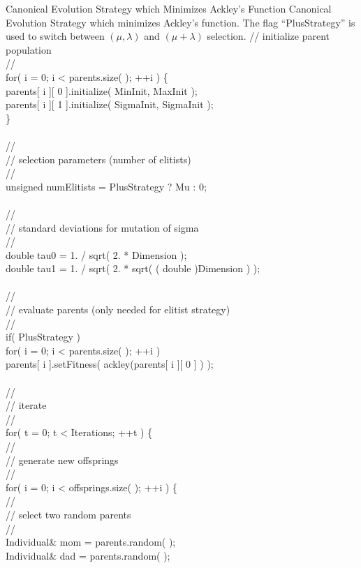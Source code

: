 \begin{programlisting}{Canonical Evolution Strategy which Minimizes Ackley's Function}{
    Canonical Evolution Strategy which minimizes Ackley's function.
    The flag ``PlusStrategy'' is used to switch between $(\mu,\lambda)$
    and $(\mu+\lambda)$ selection.}
    // initialize parent population\\
    //\\
    for( i = 0; i < parents.size( ); ++i ) \{\\
       parents[ i ][ 0 ].initialize( MinInit,   MaxInit   );\\
       parents[ i ][ 1 ].initialize( SigmaInit, SigmaInit );\\
    \}\\
\\
    //\\
    // selection parameters (number of elitists)\\
    //\\
    unsigned numElitists = PlusStrategy ? Mu : 0;\\
\\
    //\\
    // standard deviations for mutation of sigma\\
    //\\
    double     tau0 = 1. / sqrt( 2. * Dimension );\\
    double     tau1 = 1. / sqrt( 2. * sqrt( ( double )Dimension ) );\\
\\
    //\\
    // evaluate parents (only needed for elitist strategy)\\
    //\\
    if( PlusStrategy )\\
        for( i = 0; i < parents.size( ); ++i )\\
            parents[ i ].setFitness( ackley(parents[ i ][ 0 ] ) );\\
\\
    //\\
    // iterate\\
    //\\
    for( t = 0; t < Iterations; ++t ) \{\\
        //\\
        // generate new offsprings\\
        //\\
        for( i = 0; i < offsprings.size( ); ++i ) \{\\
            //\\
            // select two random parents\\
            //\\
            Individual& mom = parents.random( );\\
            Individual& dad = parents.random( );\\

\end{programlisting}

